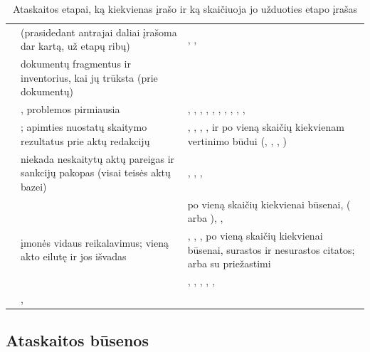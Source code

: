 \begin{table}[H]
\caption{Ataskaitos etapai, ką kiekvienas įrašo ir ką skaičiuoja jo užduoties etapo
įrašas}\label{tab:report:steps}
\begin{tabularx}{\textwidth}{@{}L{24mm}L{40mm}Y@{}}
\toprule
{} &  &  \\
\midrule
{} &  (prasidedant antrajai daliai įrašoma dar kartą, už etapų ribų) & , ,  \\
 & dokumentų fragmentus ir inventorius, kai jų trūksta (prie dokumentų) &  \\
 & , problemos pirmiausia & , , , , , , , , , ,  \\
 & ; apimties nuostatų skaitymo rezultatus prie aktų redakcijų & , , , ,  ir po vieną skaičių kiekvienam vertinimo būdui (, , , ) \\
 & niekada neskaitytų aktų pareigas ir sankcijų pakopas (visai teisės aktų bazei) & , , ,  \\
 &  & po vieną skaičių kiekvienai būsenai,  ( arba ), ,  \\
 & įmonės vidaus reikalavimus; vieną akto eilutę ir jos išvadas & , , , po vieną skaičių kiekvienai būsenai, surastos ir nesurastos citatos; arba  su priežastimi \\
 &  & , , , , ,  \\
 & ,  &  \\
\bottomrule
\end{tabularx}
\end{table}

\subsection{Ataskaitos būsenos}

